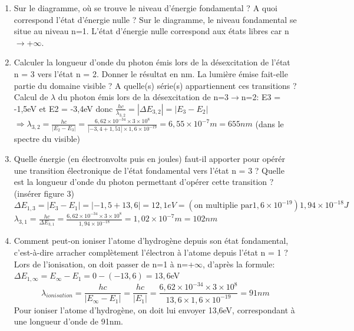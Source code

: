 \documentclass{article}
\begin{document}
\begin{enumerate}
    \item Sur le diagramme, où se trouve le niveau d'énergie fondamental ? A quoi correspond l'état d'énergie nulle ?\newline
    Sur le diagramme, le niveau fondamental se situe au niveau n=1. L'état d'énergie nulle correspond aux états libres car n$\to$+$\infty$.
    \item Calculer la longueur d'onde du photon émis lors de la désexcitation de l'état n = 3 vers l'état n = 2. Donner le résultat en nm. La lumière émise fait-elle partie du domaine visible ? A quelle(s) série(s) appartiennent ces transitions ?\newline\newline
    Calcul de $\lambda$ du photon émis lors de la désexcitation de n=3$\to$n=2:\newline
    E3 = -1,5eV et E2 = -3,4eV donc $\frac{hc}{\lambda_{3,2}} = |\Delta E_{3,2}| = |E_{3}-E_{2}|$\newline
    $\Longrightarrow\lambda_{3,2} = \frac{hc}{|E_{2}-E_{3}|} = \frac{6,62\times 10^{-34}\times 3\times 10^{8}}{|-3,4+1,51|\times 1,6\times 10^{-19}} = 6,55\times 10^{-7}m = 655nm$ (dans le spectre du visible)
    \item Quelle énergie (en électronvolts puis en joules) faut-il apporter pour opérér une transition électronique de l'état fondamental vers l'état n = 3 ? Quelle est la longueur d'onde du photon permettant d'opérer cette transition ? (insérer figure 3)\newline
    $\Delta E_{1,3}=|E_{3}-E_{1}|=|-1,5+13,6|= 12,1 eV = (\text{on multiplie par} 1,6\times 10^{-19}) 1,94\times 10^{-18}J$\newline
    $\lambda_{3,1} = \frac{hc}{\Delta E_{3,1}} = \frac{6,62\times 10^{-34}\times 3\times 10^{8}}{1,94\times 10^{-18}} = 1,02\times 10^{-7}m = 102nm$ 
    \item Comment peut-on ioniser l'atome d'hydrogène depuis son état fondamental, c'est-à-dire arracher complètement l'électron à l'atome depuis l'état n = 1 ?
    Lors de l'ionisation, on doit passer de n=1 à n=+$\infty$, d'après la formule: $\Delta E_{1,\infty} = E_{\infty}-E_{1}=0-(-13,6)= 13,6$eV
    \[ \lambda_{ionisation}=\frac{hc}{|E_{\infty}-E_{1}|} = \frac{hc}{|E_{1}|} = \frac{6,62\times 10^{-34}\times 3\times 10^{8}}{13,6\times 1,6\times 10^{-19}} = 91nm \]
    Pour ioniser l'atome d'hydrogène, on doit lui envoyer 13,6eV, correspondant à une longueur d'onde de 91nm.
    \newpage
    \begin{figure}[h]

\end{figure}
\end{enumerate}
\end{document}
